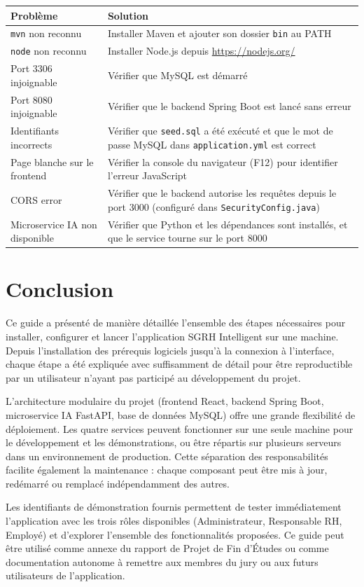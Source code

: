 \documentclass[12pt,a4paper]{report}
\begin{document}
\begin{longtable}{|p{5.5cm}|p{8cm}|}
\hline
\textbf{Problème} & \textbf{Solution} \\
\hline
\texttt{mvn} non reconnu & Installer Maven et ajouter son dossier \texttt{bin} au PATH \\
\hline
\texttt{node} non reconnu & Installer Node.js depuis \url{https://nodejs.org/} \\
\hline
Port 3306 injoignable & Vérifier que MySQL est démarré \\
\hline
Port 8080 injoignable & Vérifier que le backend Spring Boot est lancé sans erreur \\
\hline
Identifiants incorrects & Vérifier que \texttt{seed.sql} a été exécuté et que le mot de passe MySQL dans \texttt{application.yml} est correct \\
\hline
Page blanche sur le frontend & Vérifier la console du navigateur (F12) pour identifier l'erreur JavaScript \\
\hline
CORS error & Vérifier que le backend autorise les requêtes depuis le port 3000 (configuré dans \texttt{SecurityConfig.java}) \\
\hline
Microservice IA non disponible & Vérifier que Python et les dépendances sont installés, et que le service tourne sur le port 8000 \\
\hline
\end{longtable}

\chapter{Conclusion}

Ce guide a présenté de manière détaillée l'ensemble des étapes nécessaires pour installer, configurer et lancer l'application SGRH Intelligent sur une machine. Depuis l'installation des prérequis logiciels jusqu'à la connexion à l'interface, chaque étape a été expliquée avec suffisamment de détail pour être reproductible par un utilisateur n'ayant pas participé au développement du projet.

L'architecture modulaire du projet (frontend React, backend Spring Boot, microservice IA FastAPI, base de données MySQL) offre une grande flexibilité de déploiement. Les quatre services peuvent fonctionner sur une seule machine pour le développement et les démonstrations, ou être répartis sur plusieurs serveurs dans un environnement de production. Cette séparation des responsabilités facilite également la maintenance : chaque composant peut être mis à jour, redémarré ou remplacé indépendamment des autres.

Les identifiants de démonstration fournis permettent de tester immédiatement l'application avec les trois rôles disponibles (Administrateur, Responsable RH, Employé) et d'explorer l'ensemble des fonctionnalités proposées. Ce guide peut être utilisé comme annexe du rapport de Projet de Fin d'Études ou comme documentation autonome à remettre aux membres du jury ou aux futurs utilisateurs de l'application.
\end{document}
